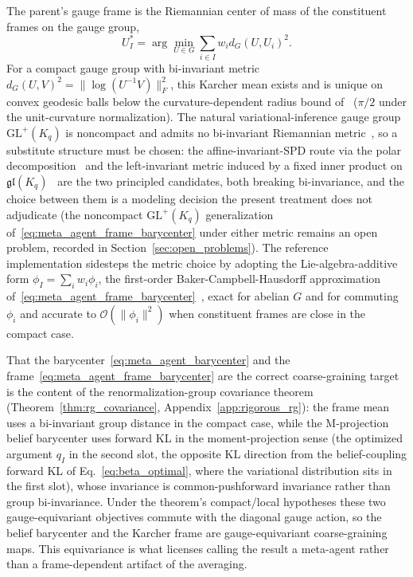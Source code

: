 \documentclass[11pt]{article}
\begin{document}
The parent's gauge frame is the Riemannian center of mass of the constituent frames on the gauge group,
\begin{equation}
U_I^* = \arg\min_{U \in G} \sum_{i \in I} w_i d_G(U, U_i)^2.
\label{eq:meta_agent_frame_barycenter}
\end{equation}
For a compact gauge group with bi-invariant metric $d_G(U, V)^2 = \|\log(U^{-1}V)\|_F^2$, this Karcher mean exists and is unique on convex geodesic balls below the curvature-dependent radius bound of~\cite{Karcher1977, Pennec2009} ($\pi/2$ under the unit-curvature normalization). The natural variational-inference gauge group $\mathrm{GL}^+(K_q)$ is noncompact and admits no bi-invariant Riemannian metric~\cite{Milnor1976}, so a substitute structure must be chosen: the affine-invariant-SPD route via the polar decomposition~\cite{PennecFillardAyache2006} and the left-invariant metric induced by a fixed inner product on $\mathfrak{gl}(K_q)$~\cite{BonnabelSepulchre2009} are the two principled candidates, both breaking bi-invariance, and the choice between them is a modeling decision the present treatment does not adjudicate (the noncompact $\mathrm{GL}^+(K_q)$ generalization of~\eqref{eq:meta_agent_frame_barycenter} under either metric remains an open problem, recorded in Section~\ref{sec:open_problems}). The reference implementation sidesteps the metric choice by adopting the Lie-algebra-additive form $\phi_I = \sum_i w_i \phi_i$, the first-order Baker-Campbell-Hausdorff approximation of~\eqref{eq:meta_agent_frame_barycenter}~\cite{Hall2015}, exact for abelian $G$ and for commuting $\phi_i$ and accurate to $\mathcal{O}(\|\phi_i\|^2)$ when constituent frames are close in the compact case.

That the barycenter~\eqref{eq:meta_agent_barycenter} and the frame~\eqref{eq:meta_agent_frame_barycenter} are the correct coarse-graining target is the content of the renormalization-group covariance theorem (Theorem~\ref{thm:rg_covariance}, Appendix~\ref{app:rigorous_rg}): the frame mean uses a bi-invariant group distance in the compact case, while the M-projection belief barycenter uses forward KL in the moment-projection sense (the optimized argument $q_I$ in the second slot, the opposite KL direction from the belief-coupling forward KL of Eq.~\eqref{eq:beta_optimal}, where the variational distribution sits in the first slot), whose invariance is common-pushforward invariance rather than group bi-invariance. Under the theorem's compact/local hypotheses these two gauge-equivariant objectives commute with the diagonal gauge action, so the belief barycenter and the Karcher frame are gauge-equivariant coarse-graining maps. This equivariance is what licenses calling the result a meta-agent rather than a frame-dependent artifact of the averaging.
\end{document}
